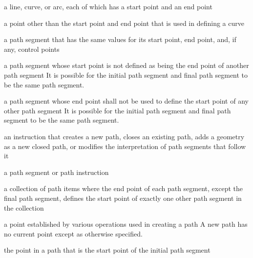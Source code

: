 
a line, \bezierlocal curve, or arc, each of which has a start point and an end point

a point other than the start point and end point that is used in defining a \bezierlocal curve

a path segment that has the same values for its start point, end point, and, if any, control points

a path segment whose start point is not defined as being the end point of another path segment
\enternote
It is possible for the initial path segment and final path segment to be the same path segment.
\exitnote

a path segment whose end point shall not be used to define the start point of any other path segment
\enternote
It is possible for the initial path segment and final path segment to be the same path segment.
\exitnote

an instruction that creates a new path, closes an existing path, adds a geometry as a new closed path, or modifies the interpretation of path segments that follow it

a path segment or path instruction

a collection of path items where the end point of each path segment, except the final path segment, defines the start point of exactly one other path segment in the collection

a point established by various operations used in creating a path
\enternote
A new path has no current point except as otherwise specified.
\exitnote

the point in a path that is the start point of the initial path segment

